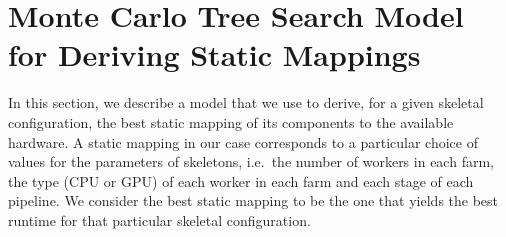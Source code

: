 \documentclass[smallextended]{svjour3}
\begin{document}
\section{Monte Carlo Tree Search Model for Deriving Static Mappings}

\noindent
In this section, we describe a model that we use to derive, for a
given skeletal configuration, the best static mapping of its components to
the available hardware. A static mapping in our case corresponds to a
particular choice of values for the parameters of skeletons, i.e.\ the number of workers in
each farm, the type (CPU or GPU) of each worker in each farm and each stage of each pipeline. We
consider the best static mapping to be the one that
yields the best runtime for that particular skeletal
configuration.




\end{document}
